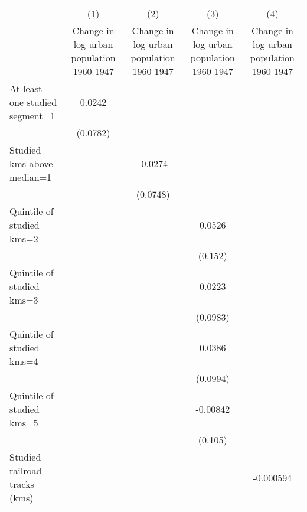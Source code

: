 {
\def\sym#1{\ifmmode^{#1}\else\(^{#1}\)\fi}
\begin{tabular}{l*{4}{c}}
\hline\hline
                    &\multicolumn{1}{c}{(1)}&\multicolumn{1}{c}{(2)}&\multicolumn{1}{c}{(3)}&\multicolumn{1}{c}{(4)}\\
                    &\multicolumn{1}{c}{Change in log urban population 1960-1947}&\multicolumn{1}{c}{Change in log urban population 1960-1947}&\multicolumn{1}{c}{Change in log urban population 1960-1947}&\multicolumn{1}{c}{Change in log urban population 1960-1947}\\
\hline
At least one studied segment=1&      0.0242         &                     &                     &                     \\
                    &    (0.0782)         &                     &                     &                     \\
[1em]
Studied kms above median=1&                     &     -0.0274         &                     &                     \\
                    &                     &    (0.0748)         &                     &                     \\
[1em]
Quintile of studied kms=2&                     &                     &      0.0526         &                     \\
                    &                     &                     &     (0.152)         &                     \\
[1em]
Quintile of studied kms=3&                     &                     &      0.0223         &                     \\
                    &                     &                     &    (0.0983)         &                     \\
[1em]
Quintile of studied kms=4&                     &                     &      0.0386         &                     \\
                    &                     &                     &    (0.0994)         &                     \\
[1em]
Quintile of studied kms=5&                     &                     &    -0.00842         &                     \\
                    &                     &                     &     (0.105)         &                     \\
[1em]
Studied railroad tracks (kms)&                     &                     &                     &   -0.000594         \\

\end{tabular}}
